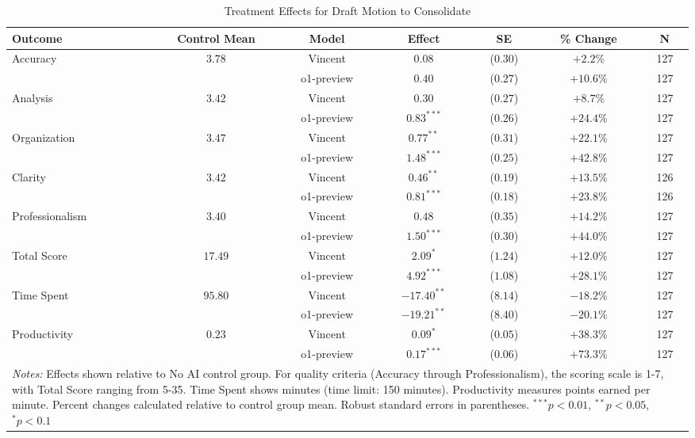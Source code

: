 \begin{table}[!htbp]
\centering
\caption{Treatment Effects for Draft Motion to Consolidate}
\label{tab:task5_effects}
\begin{tabular}{lcccccc}
\hline\hline
Outcome & Control Mean & Model & Effect & SE & \% Change & N \\
\hline
\multirow{2}{*}{Accuracy} & \multirow{2}{*}{$3.78$} & Vincent & $0.08$ & ($0.30$) & $+2.2\%$ & 127 \\
& & o1-preview & $0.40$ & ($0.27$) & $+10.6\%$ & 127 \\
\hline
\multirow{2}{*}{Analysis} & \multirow{2}{*}{$3.42$} & Vincent & $0.30$ & ($0.27$) & $+8.7\%$ & 127 \\
& & o1-preview & $0.83^{***}$ & ($0.26$) & $+24.4\%$ & 127 \\
\hline
\multirow{2}{*}{Organization} & \multirow{2}{*}{$3.47$} & Vincent & $0.77^{**}$ & ($0.31$) & $+22.1\%$ & 127 \\
& & o1-preview & $1.48^{***}$ & ($0.25$) & $+42.8\%$ & 127 \\
\hline
\multirow{2}{*}{Clarity} & \multirow{2}{*}{$3.42$} & Vincent & $0.46^{**}$ & ($0.19$) & $+13.5\%$ & 126 \\
& & o1-preview & $0.81^{***}$ & ($0.18$) & $+23.8\%$ & 126 \\
\hline
\multirow{2}{*}{Professionalism} & \multirow{2}{*}{$3.40$} & Vincent & $0.48$ & ($0.35$) & $+14.2\%$ & 127 \\
& & o1-preview & $1.50^{***}$ & ($0.30$) & $+44.0\%$ & 127 \\
\hline
\multirow{2}{*}{Total Score} & \multirow{2}{*}{$17.49$} & Vincent & $2.09^{*}$ & ($1.24$) & $+12.0\%$ & 127 \\
& & o1-preview & $4.92^{***}$ & ($1.08$) & $+28.1\%$ & 127 \\
\hline
\multirow{2}{*}{Time Spent} & \multirow{2}{*}{$95.80$} & Vincent & $-17.40^{**}$ & ($8.14$) & $-18.2\%$ & 127 \\
& & o1-preview & $-19.21^{**}$ & ($8.40$) & $-20.1\%$ & 127 \\
\hline
\multirow{2}{*}{Productivity} & \multirow{2}{*}{$0.23$} & Vincent & $0.09^{*}$ & ($0.05$) & $+38.3\%$ & 127 \\
& & o1-preview & $0.17^{***}$ & ($0.06$) & $+73.3\%$ & 127 \\
\hline
\multicolumn{7}{p{0.95\linewidth}}{\footnotesize \textit{Notes:} Effects shown relative to No AI control group. For quality criteria (Accuracy through Professionalism), the scoring scale is 1-7, with Total Score ranging from 5-35. Time Spent shows minutes (time limit: 150 minutes). Productivity measures points earned per minute. Percent changes calculated relative to control group mean. Robust standard errors in parentheses. $^{***}p<0.01$, $^{**}p<0.05$, $^{*}p<0.1$}
\end{tabular}
\end{table}